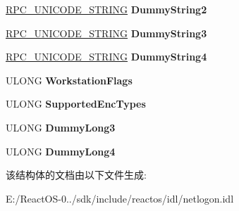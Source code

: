 \begin{DoxyCompactItemize}
\item 
\mbox{\label{struct___n_e_t_l_o_g_o_n___d_o_m_a_i_n___i_n_f_o_aeca538826a23a400c0fa1bd3c9d86bdc}} 
\hyperlink{struct___r_p_c___u_n_i_c_o_d_e___s_t_r_i_n_g}{R\+P\+C\+\_\+\+U\+N\+I\+C\+O\+D\+E\+\_\+\+S\+T\+R\+I\+NG} {\bfseries Dummy\+String2}
\item 
\mbox{\label{struct___n_e_t_l_o_g_o_n___d_o_m_a_i_n___i_n_f_o_ac7f9ba17d2875f26a577ec8518469229}} 
\hyperlink{struct___r_p_c___u_n_i_c_o_d_e___s_t_r_i_n_g}{R\+P\+C\+\_\+\+U\+N\+I\+C\+O\+D\+E\+\_\+\+S\+T\+R\+I\+NG} {\bfseries Dummy\+String3}
\item 
\mbox{\label{struct___n_e_t_l_o_g_o_n___d_o_m_a_i_n___i_n_f_o_aed881db8c7814e48778fc0f3180eb9dd}} 
\hyperlink{struct___r_p_c___u_n_i_c_o_d_e___s_t_r_i_n_g}{R\+P\+C\+\_\+\+U\+N\+I\+C\+O\+D\+E\+\_\+\+S\+T\+R\+I\+NG} {\bfseries Dummy\+String4}
\item 
\mbox{\label{struct___n_e_t_l_o_g_o_n___d_o_m_a_i_n___i_n_f_o_a6aa3e10b2bd3c0b41f928ea5ebe8790b}} 
U\+L\+O\+NG {\bfseries Workstation\+Flags}
\item 
\mbox{\label{struct___n_e_t_l_o_g_o_n___d_o_m_a_i_n___i_n_f_o_a1e75e7b0f3fa75b3fec127c2d4bfa832}} 
U\+L\+O\+NG {\bfseries Supported\+Enc\+Types}
\item 
\mbox{\label{struct___n_e_t_l_o_g_o_n___d_o_m_a_i_n___i_n_f_o_a6a3f16ab8c8c2fb16560c366a1c29f04}} 
U\+L\+O\+NG {\bfseries Dummy\+Long3}
\item 
\mbox{\label{struct___n_e_t_l_o_g_o_n___d_o_m_a_i_n___i_n_f_o_a2de18cb44e0818634be0be45175f5778}} 
U\+L\+O\+NG {\bfseries Dummy\+Long4}
\end{DoxyCompactItemize}


该结构体的文档由以下文件生成\+:\begin{DoxyCompactItemize}
\item 
E\+:/\+React\+O\+S-\/0../sdk/include/reactos/idl/netlogon.\+idl\end{DoxyCompactItemize}
